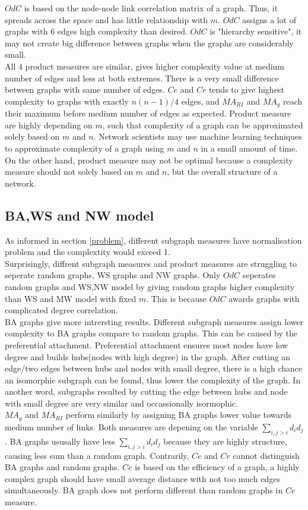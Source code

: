 \documentclass[12pt]{article}
\begin{document}
{$OdC$ is based on the node-node link correlation matrix of a graph.\cite{odc} Thus, it spreads across the space and has little relationship with $m$. $OdC$ assigns a lot of graphs with 6 edges high complexity than desired. $OdC$ is "hierarchy sensitive", it may not create big difference between graphs when the graphs are considerably small.\\

All 4 product measures are similar, gives higher complexity value at medium number of edges and less at both extremes. There is a very small difference between graphs with same number of edges. $Ce$ and $Cr$ tends to give highest complexity to graphs with exactly $n(n-1)/4$ edges, and $MA_{RI}$ and $MA_{g}$ reach their maximum before medium number of edges as expected. Product measure are highly depending on $m$, such that complexity of a graph can be approximated solely based on $m$ and $n$. Network scientists may use machine learning techniques to approximate complexity of a graph using $m$ and $n$ in a small amount of time. On the other hand, product measure may not be optimal because a complexity measure should not solely based on $m$ and $n$, but the overall structure of a network.


\subsection{BA,WS and NW model}

\noindent
As informed in section \ref{problem}, different subgraph measures have normalisation problem and the complextity would exceed 1.\\
Surprisingly, diffrent subgraph measures and product measures are struggling to seperate random graphs, WS graphs and NW graphs. Only $OdC$ seperates random graphs and WS,NW model by giving random graphs higher complexity than WS and MW model with fixed $m$. This is because $OdC$ awards graphs with complicated degree correlation.\\
BA graphs give more intrersting results. Different subgraph measures assign lower complexity to BA graphs compare to random graphs. This can be caused by the preferential attachment. Preferential attachment ensures most nodes have low degree and builds hubs(nodes with high degree) in the graph. After cutting an edge/two edges between hubs and nodes with small degree, there is a high chance an isomorphic subgraph can be found, thus lower the complexity of the graph. In another word, subgraphs resulted by cutting the edge between hubs and node with small degree are very similar and occassionally isormophic.\\
$MA_g$ and $MA_{RI}$ perform similarly by assigning BA graphs lower value towards medium number of links. Both measures are depening on the variable $\sum_{i,j>i}d_id_j$. BA graphs ususally have less $\sum_{i,j>i}d_id_j$ because they are highly structure, causing less sum than a random graph. Contrarily, $Ce$ and $Cr$ cannot distinguish BA graphs and random graphs. $Ce$ is based on the efficiency of a graph, a highly complex graph should have small average distance with not too much edges simultaneously. BA graph does not perform different than random graphs in $Ce$ measure.\\

}
\end{document}
